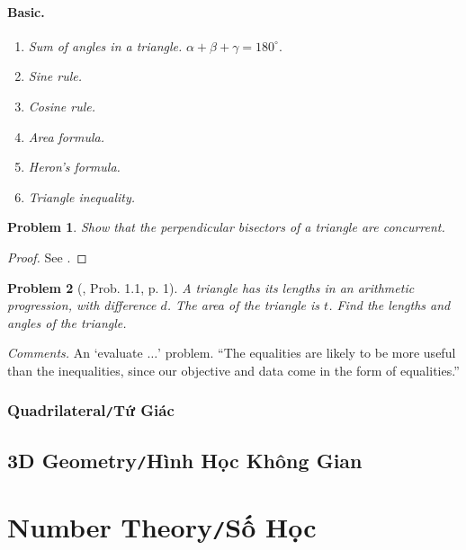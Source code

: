 \documentclass{article}
\numberwithin{equation}{section}
\newtheorem{problem}{Problem}[section]
\begin{document}
\paragraph{Basic.}
\begin{enumerate}
	\item \textit{Sum of angles in a triangle.} $\alpha + \beta + \gamma = 180^\circ$.
	\item \textit{Sine rule.}
	\item \textit{Cosine rule.}
	\item \textit{Area formula.}
	\item \textit{Heron's formula.}
	\item \textit{Triangle inequality.}
\end{enumerate}

\begin{problem}
	Show that the perpendicular bisectors of a triangle are concurrent.
\end{problem}

\begin{proof}[Proof]
	See \cite[p. ix]{Tao2006}.
\end{proof}

\begin{problem}[\cite{Tao2006}, Prob. 1.1, p. 1]
	A triangle has its lengths in an arithmetic progression, with difference $d$. The area of the triangle is $t$. Find the lengths and angles of the triangle.
\end{problem}
\textit{Comments.} An `evaluate $\ldots$' problem. ``The equalities are likely to be more useful than the inequalities, since our objective and data come in the form of equalities.''

\subsubsection{Quadrilateral\texttt{/}Tứ Giác}

\subsection{3D Geometry\texttt{/}Hình Học Không Gian}

\section{Number Theory\texttt{/}Số Học}
\end{document}
